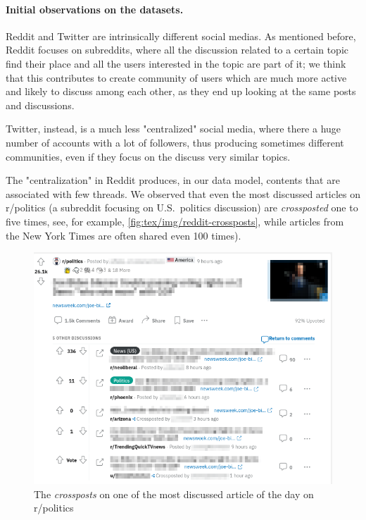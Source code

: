 \paragraph{Initial observations on the datasets.}%
\label{par:some_observations_on_the_datasets}

Reddit and Twitter are intrinsically different social medias. As mentioned
before, Reddit focuses on subreddits, where all the discussion related to a
certain topic find their place and all the users interested in the topic are
part of it; we think that this contributes to create community of users which are much more
active and likely to discuss among each other, as they end up looking at the
same posts and discussions.

Twitter, instead, is a much less "centralized" social media, where there a
huge number of accounts with a lot of
followers, thus producing sometimes different communities, even if they focus
on the discuss very similar topics.

The "centralization" in Reddit produces, in our data model, contents that are
associated with few threads. We observed that even the most discussed articles
on r/politics (a subreddit focusing on U.S.\ politics discussion) are
\emph{crossposted} one to five times, see, for example,
\autoref{fig:tex/img/reddit-crossposts}, while articles from the New York Times are
often shared even 100 times).

\begin{figure}
	\centering
	\includegraphics[width=0.8\linewidth]{tex/img/reddit-crossposts.png}
	\caption{The \emph{crossposts} on one of the most discussed article of the
		day on r/politics}%
	\label{fig:tex/img/reddit-crossposts}
\end{figure}

